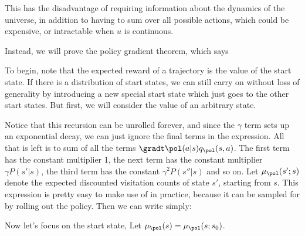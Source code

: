 \documentclass[12pt]{article}
\begin{document}
This has the disadvantage of requiring information about the dynamics of the universe, in addition to having to sum over all possible actions, which could be expensive, or intractable when $u$ is continuous.

Instead, we will prove the policy gradient theorem, which says


To begin, note that the expected reward of a trajectory is the value of the start state. If there is a distribution of start states, we can still carry on without loss of generality by introducing a new special start state which just goes to the other start states. But first, we will consider the value of an arbitrary state.


Notice that this recursion can be unrolled forever, and since the $\gamma$ term sets up an exponential decay, we can just ignore the final terms in the expression. All that is left is to sum of all the terms $\gradt \pol(a|s) q_{\pol}(s, a)$. The first term has the constant multiplier 1, the next term has the constant multiplier $\gamma P(s'|s)$, the third term has the constant $\gamma^2 P(s''|s)$ and so on. Let $\mu_{\pol}(s';s)$ denote the expected discounted visitation counts of state $s'$, starting from $s$. This expression is pretty easy to make use of in practice, because it can be sampled for by rolling out the policy. Then we can write simply:


Now let's focus on the start state, Let $\mu_{\pol}(s) = \mu_{\pol}(s;s_0)$.

\end{document}
